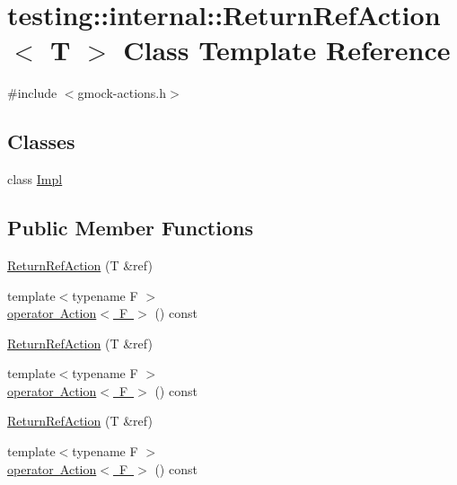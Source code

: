 \hypertarget{classtesting_1_1internal_1_1_return_ref_action}{}\section{testing\+::internal\+::Return\+Ref\+Action$<$ T $>$ Class Template Reference}
\label{classtesting_1_1internal_1_1_return_ref_action}


{\ttfamily \#include $<$gmock-\/actions.\+h$>$}

\subsection*{Classes}
\begin{DoxyCompactItemize}
\item 
class \mbox{\hyperlink{classtesting_1_1internal_1_1_return_ref_action_1_1_impl}{Impl}}
\end{DoxyCompactItemize}
\subsection*{Public Member Functions}
\begin{DoxyCompactItemize}
\item 
\mbox{\hyperlink{classtesting_1_1internal_1_1_return_ref_action_a1384b1cd78f3069f0493e2302f143701}{Return\+Ref\+Action}} (T \&ref)
\item 
{\footnotesize template$<$typename F $>$ }\\\mbox{\hyperlink{classtesting_1_1internal_1_1_return_ref_action_a48e5d411097707e558af62eb68edc162}{operator Action$<$ F $>$}} () const
\item 
\mbox{\hyperlink{classtesting_1_1internal_1_1_return_ref_action_a1384b1cd78f3069f0493e2302f143701}{Return\+Ref\+Action}} (T \&ref)
\item 
{\footnotesize template$<$typename F $>$ }\\\mbox{\hyperlink{classtesting_1_1internal_1_1_return_ref_action_a48e5d411097707e558af62eb68edc162}{operator Action$<$ F $>$}} () const
\item 
\mbox{\hyperlink{classtesting_1_1internal_1_1_return_ref_action_a1384b1cd78f3069f0493e2302f143701}{Return\+Ref\+Action}} (T \&ref)
\item 
{\footnotesize template$<$typename F $>$ }\\\mbox{\hyperlink{classtesting_1_1internal_1_1_return_ref_action_a48e5d411097707e558af62eb68edc162}{operator Action$<$ F $>$}} () const
\end{DoxyCompactItemize}
